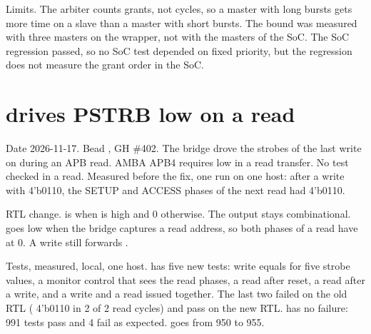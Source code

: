 \begin{record}

Limits. The arbiter counts grants, not cycles, so a master with long bursts gets more time on a slave than a master with short bursts. The bound was measured with three masters on the wrapper, not with the masters of the SoC. The SoC regression passed, so no SoC test depended on fixed priority, but the regression does not measure the grant order in the SoC.

\end{record}

\section{ drives PSTRB low on a read}\label{cr:defect:axil-to-apb-read-pstrb}

\begin{record}

Date 2026-11-17. Bead , GH \#402. The bridge  drove the strobes of the last write on  during an APB read. AMBA APB4 requires  low in a read transfer. No test checked  in a read. Measured before the fix, one run on one host: after a write with  4'b0110, the SETUP and ACCESS phases of the next read had  4'b0110.

\end{record}

\begin{record}

RTL change.  is  when  is high and 0 otherwise. The output stays combinational.  goes low when the bridge captures a read address, so both phases of a read have  at 0. A write still forwards .

\end{record}

\begin{record}

Tests, measured, local, one host.  has five new tests: write  equals  for five strobe values, a monitor control that sees the read phases, a read after reset, a read after a write, and a write and a read issued together. The last two failed on the old RTL ( 4'b0110 in 2 of 2 read cycles) and pass on the new RTL.  has no failure: 991 tests pass and 4 fail as expected.  goes from 950 to 955.

\end{record}

